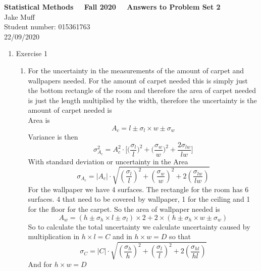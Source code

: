 \documentclass[12pt]{article}
\begin{document}
\normalsize

\baselineskip 14pt

\begin{center}
{\Large {\bf Statistical Methods \ \ Fall 2020 \ \  Answers to Problem Set 2}}\\
{\large { Jake Muff}}\\
{Student number: 015361763}\\
{22/09/2020}
\end{center}



\begin{enumerate}

\item Exercise 1
\begin{enumerate}
    \item For the uncertainty in the measurements of the amount of carpet and wallpapers needed. For the amount of carpet needed this is simply just the bottom rectangle of the room and therefore the area of carpet needed is just the length multiplied by the width, therefore the uncertainty is the amount of carpet needed is 
    \\
    Area is 
    $$ A_c = l \pm \sigma_l \times w \pm \sigma_w $$
    Variance is then 
    $$ \sigma_{A_c}^2 = A_c^2 \cdot \Bigg[ \Big(\frac{\sigma_l}{l}\Big)^2 + \Big(\frac{\sigma_w}{w}\Big)^2 + \frac{2 \sigma{_{lw}}}{lw}\Bigg] $$
    With standard deviation or uncertainty in the Area 
    \begin{equation}
        \mathit{\sigma_{A_c}} = |A_c| \cdot  \sqrt{\left(\dfrac{\sigma_l}{l}\right)^2 + \left(\dfrac{\sigma_w}{w}\right)^2 + 2\left(\dfrac{\sigma_{lw}}{lw}\right)}
        \end{equation}
    For the wallpaper we have 4 surfaces. The rectangle for the room has 6 surfaces. 4 that need to be covered by wallpaper, 1 for the ceiling and 1 for the floor for the carpet. So the area of wallpaper needed is 
    $$ A_w = (h \pm \sigma_h \times l \pm \sigma_l) \times 2 + 2 \times (h \pm \sigma_h \times w \pm \sigma_w) $$
    So to calculate the total uncertainty we calculate uncertainty caused by multiplication in $h \times l = C$ and in $h \times w = D$ so that 
    \begin{equation}
        \mathit{\sigma_{C}} = |C| \cdot  \sqrt{\left(\dfrac{\sigma_h}{h}\right)^2 + \left(\dfrac{\sigma_l}{l}\right)^2 + 2\left(\dfrac{\sigma_{hl}}{hl}\right)}
        \end{equation}
    And for $h \times w = D$ 
    \begin{equation}

\end{equation}
\end{enumerate}
\end{enumerate}
\end{document}
